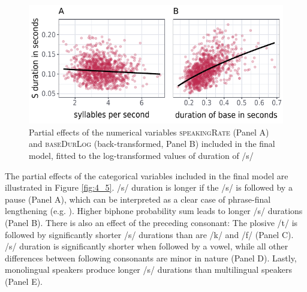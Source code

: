 \begin{figure}
    \centering
    \includegraphics[width=1\textwidth]{figures/fig4.4.pdf}
    \caption{Partial effects of the numerical variables \textsc{speakingRate} (Panel A) and \textsc{baseDurLog} (back-transformed, Panel B) included in the final model, fitted to the log-transformed values of duration of /s/}
    \label{fig:4_4}
\end{figure}


The partial effects of the categorical variables included in the final model are illustrated in Figure \ref{fig:4_5}. /s/ duration is longer if the /s/ is followed by a pause (Panel A), which can be interpreted as a clear case of phrase-final lengthening (e.g. \cite{Cooper1981}). Higher biphone probability sum leads to longer /s/ durations (Panel B). There is also an effect of the preceding consonant: The plosive /t/ is followed by significantly shorter /s/ durations than are /k/ and /f/ (Panel C). /s/ duration is significantly shorter when followed by a vowel, while all other differences between following consonants are minor in nature (Panel D). Lastly, monolingual speakers produce longer /s/ durations than multilingual speakers (Panel E).

